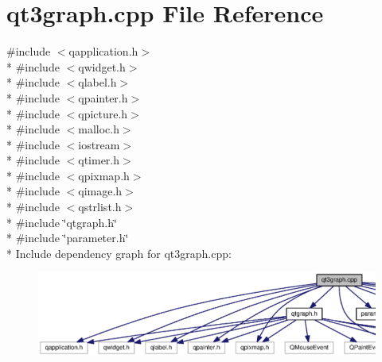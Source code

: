 \section{qt3graph.\-cpp File Reference}
\label{qt3graph_8cpp}
{\ttfamily \#include $<$qapplication.\-h$>$}\\*
{\ttfamily \#include $<$qwidget.\-h$>$}\\*
{\ttfamily \#include $<$qlabel.\-h$>$}\\*
{\ttfamily \#include $<$qpainter.\-h$>$}\\*
{\ttfamily \#include $<$qpicture.\-h$>$}\\*
{\ttfamily \#include $<$malloc.\-h$>$}\\*
{\ttfamily \#include $<$iostream$>$}\\*
{\ttfamily \#include $<$qtimer.\-h$>$}\\*
{\ttfamily \#include $<$qpixmap.\-h$>$}\\*
{\ttfamily \#include $<$qimage.\-h$>$}\\*
{\ttfamily \#include $<$qstrlist.\-h$>$}\\*
{\ttfamily \#include \char`\"{}qtgraph.\-h\char`\"{}}\\*
{\ttfamily \#include \char`\"{}parameter.\-h\char`\"{}}\\*
Include dependency graph for qt3graph.\-cpp\-:
\nopagebreak
\begin{figure}[H]
\begin{center}
\leavevmode
\includegraphics[width=350pt]{qt3graph_8cpp__incl}
\end{center}
\end{figure}
